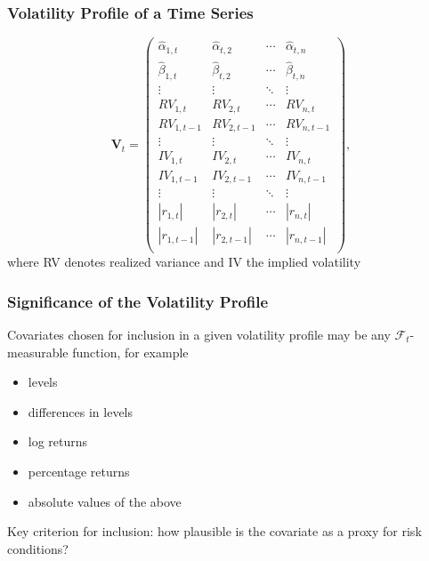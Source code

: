 \documentclass[9pt]{beamer}
\newcommand{\V}{\textbf{V}}
\theoremstyle{definition}
\begin{document}
\begin{frame}
\frametitle{Volatility Profile of a Time Series}
\fontsize{6.6}{7}

\begin{equation*}
    \V_{t} = 
    \begin{pmatrix}
    \hat\alpha_{1,t} & \hat\alpha_{t,2}  & \cdots & \hat\alpha_{t,n}  \\
    \hat\beta_{1,t} & \hat\beta_{t,2}  & \cdots & \hat\beta_{t,n}  \\
    \vdots  & \vdots  & \ddots & \vdots  \\
    RV_{1,t} & RV_{2,t}  & \cdots & RV_{n,t}  \\
    RV_{1,t-1}  & RV_{2,t-1}  & \cdots & RV_{n,t-1}  \\
    \vdots  & \vdots  & \ddots & \vdots  \\
    IV_{1,t} & IV_{2,t} & \cdots & IV_{n,t} \\
    IV_{1,t-1}  & IV_{2,t-1}  & \cdots & IV_{n,t-1} \\
    \vdots  & \vdots  & \ddots & \vdots  \\
    |r_{1,t}| & |r_{2,t}| & \cdots & |r_{n,t}| \\
    |r_{1,t-1}|  & |r_{2,t-1}|  & \cdots & |r_{n,t-1}| \\
    \end{pmatrix},
    \end{equation*}
    \bigbreak
    where RV denotes realized variance and IV the implied volatility
\end{frame}

\begin{frame}
    \frametitle{Significance of the Volatility Profile}
    Covariates chosen for inclusion in a given volatility profile may be any $\mathcal{F}_{t}$-measurable function, for example
    \begin{itemize}
        \item levels
        \item differences in levels
        \item log returns
        \item percentage returns
        \item absolute values of the above
    \end{itemize}

    \bigbreak 

    Key criterion for inclusion: how plausible is the covariate as a proxy for risk conditions?
\end{frame}
\end{document}
